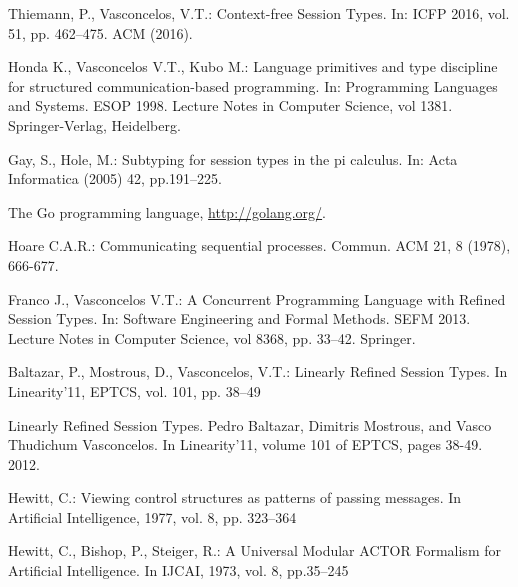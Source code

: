 
\begin{thebibliography}{8}

  Thiemann, P., Vasconcelos, V.T.: Context-free Session Types. In: ICFP 2016, vol. 51, pp. 462--475. ACM (2016). 

  Honda K., Vasconcelos V.T., Kubo M.: Language primitives and type discipline for structured communication-based programming. In: Programming Languages and Systems. ESOP 1998. Lecture Notes in Computer Science, vol 1381. Springer-Verlag, Heidelberg. 

  Gay, S., Hole, M.: Subtyping for session types in the pi calculus. In: Acta Informatica (2005)
  42, pp.191–225. 

  The Go programming language, \url{http://golang.org/}.

  Hoare C.A.R.: Communicating sequential processes. Commun. ACM 21, 8 (1978), 666-677. 
  
    Franco J., Vasconcelos V.T.: A Concurrent Programming Language with Refined Session Types. In: Software Engineering and Formal Methods. SEFM 2013. Lecture Notes in Computer Science, vol 8368, pp. 33--42. Springer. 

  Baltazar, P., Mostrous, D., Vasconcelos, V.T.: Linearly Refined Session Types. In Linearity'11, EPTCS, vol. 101, pp. 38--49

  Linearly Refined Session Types. Pedro Baltazar, Dimitris Mostrous, and Vasco Thudichum Vasconcelos. In Linearity'11, volume 101 of EPTCS, pages 38-49. 2012. 
  
   Hewitt, C.: Viewing control structures as patterns of passing messages. In Artificial Intelligence, 1977, vol. 8, pp. 323--364

   Hewitt, C., Bishop, P., Steiger, R.: A Universal Modular ACTOR Formalism for Artificial Intelligence. In IJCAI, 1973, vol. 8, pp.35--245

  
  

\end{thebibliography}
